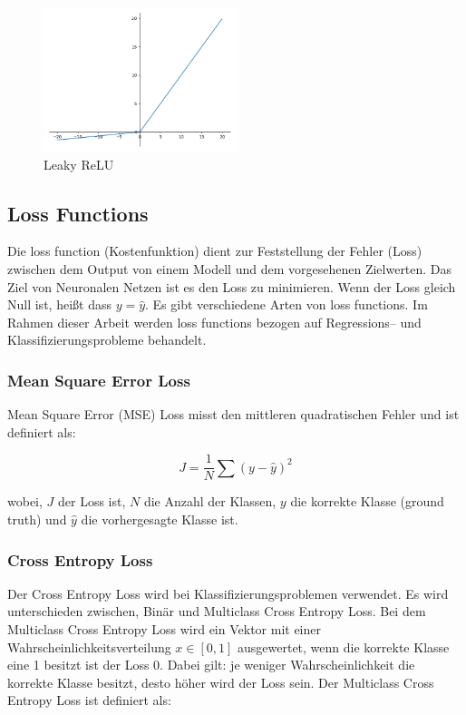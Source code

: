 \begin{figure}[H]
  \centering
  \includegraphics[width=0.5\textwidth]{resources/nn/leaky-relu.png}
  \caption{
    Leaky ReLU 
    \cite{leaky-relu}
  }
  \label{image:leaky-relu}
\end{figure}

\newpage
\subsection{Loss Functions}
Die \gls{loss function} (Kostenfunktion) dient zur Feststellung der Fehler (Loss) zwischen dem Output von einem Modell und dem vorgesehenen Zielwerten. 
Das Ziel von Neuronalen Netzen ist es den Loss zu minimieren. Wenn der Loss gleich Null ist, heißt dass $ y = \hat{y} $. Es gibt verschiedene Arten 
von \gls{loss function}s. Im Rahmen dieser Arbeit werden \gls{loss function}s bezogen auf Regressions– und Klassifizierungsprobleme behandelt.

\subsubsection{Mean Square Error Loss}
Mean Square Error (MSE) Loss misst den mittleren quadratischen Fehler und ist definiert als:

\begin{equation}
  J = \frac{1}{N} \sum (y - \hat{y})^2
\end{equation}

wobei, $J$ der Loss ist, $N$ die Anzahl der Klassen, $y$ die korrekte Klasse (\gls{ground truth}) und $ \hat{y}$ die vorhergesagte Klasse ist.

\subsubsection{Cross Entropy Loss}
Der Cross Entropy Loss wird bei Klassifizierungsproblemen verwendet. Es wird unterschieden zwischen, Binär und Multiclass Cross Entropy Loss. 
Bei dem Multiclass Cross Entropy Loss wird ein Vektor mit einer Wahrscheinlichkeitsverteilung $ x \in [0, 1] $ 
ausgewertet, wenn die korrekte Klasse eine 1 besitzt ist der Loss 0. Dabei gilt: je weniger Wahrscheinlichkeit die korrekte Klasse besitzt, 
desto höher wird der Loss sein. Der Multiclass Cross Entropy Loss ist definiert als: 

